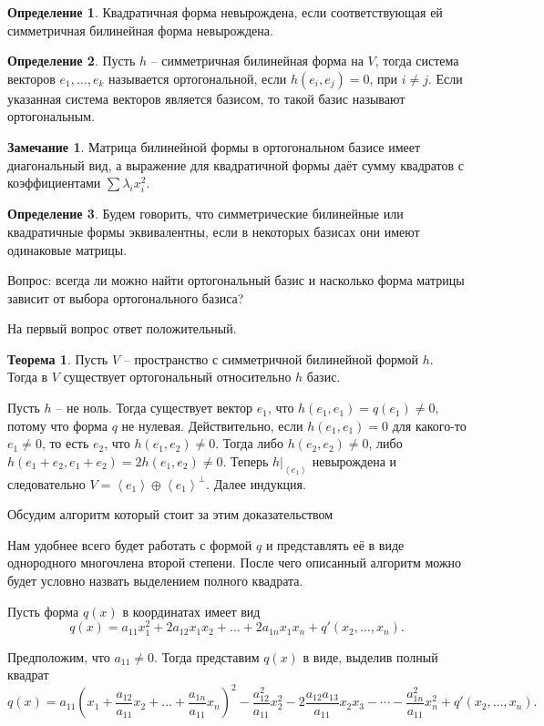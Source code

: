 \documentclass[10pt,a4paper,oneside]{book}
\theoremstyle{definition}
\newtheorem*{rem}{Замечание}
\newtheorem*{defn}{Определение}
\newtheorem{thm}{Теорема}
\def\lan{\left\langle }
\def\ran{\right\rangle}
\def\thrm{\begin{thm}}
\def\ethrm{\end{thm}}
\def\dfn{\begin{defn}}
\def\edfn{\end{defn}}
\def\rm{\begin{rem}}
\def\erm{\end{rem}}
\begin{document}
\dfn Квадратичная форма невырождена, если соответствующая ей симметричная билинейная форма невырождена.
\edfn

\dfn Пусть $h$ -- симметричная билинейная форма на $V$, тогда система векторов $e_1,\dots,e_k$ называется ортогональной, если $h(e_i,e_j)=0$, при $i\neq j$. Если указанная система векторов является базисом, то такой базис называют ортогональным.
\edfn

\rm Матрица билинейной формы в ортогональном базисе имеет диагональный вид, а выражение для квадратичной формы даёт сумму квадратов с коэффициентами $\sum \lambda_i x_i^2$.
\erm

\dfn Будем говорить, что симметрические билинейные или квадратичные формы эквивалентны, если в некоторых базисах они имеют одинаковые матрицы.
\edfn

Вопрос: всегда ли можно найти ортогональный базис и насколько форма матрицы зависит от выбора ортогонального базиса? 

На первый вопрос ответ положительный.

\thrm Пусть $V$ -- пространство с симметричной билинейной формой $h$. Тогда в $V$ существует ортогональный относительно $h$ базис. 
\ethrm
\proof
Пусть $h$ -- не ноль. Тогда существует вектор $e_1$, что $h(e_1,e_1)=q(e_1)\neq 0$, потому что форма $q$ не нулевая. Действительно, если $h(e_1,e_1)=0$ для какого-то $e_1 \neq 0$, то есть $e_2$, что $h(e_1,e_2)\neq 0$. Тогда либо $h(e_2,e_2)\neq 0$, либо $h(e_1+e_2,e_1+e_2)=2h(e_1,e_2)\neq 0$. 
Теперь $h|_{\lan e_1\ran}$ невырождена и следовательно $V=\lan e_1 \ran \oplus \lan e_1 \ran^{\bot}$. Далее индукция.
\endproof







Обсудим алгоритм который стоит за этим доказательством


Нам удобнее всего будет работать с формой $q$ и представлять её в виде однородного многочлена второй степени. После чего описанный алгоритм можно будет условно назвать выделением полного квадрата.

Пусть форма $q(x)$ в координатах имеет вид
$$q(x)= a_{11}x_1^2+ 2a_{12}x_1x_2 + \dots + 2a_{1n}x_1x_n  + q'(x_2, \dots, x_n).$$

 Предположим, что $a_{11}\neq 0$. Тогда представим $q(x)$ в виде, выделив полный квадрат 
$$q(x)= a_{11}\left(x_1+\frac{a_{12}}{a_{11}}x_2 + \dots +\frac{a_{1n}}{a_{11}}x_n\right)^2 - \frac{a_{12}^2}{a_{11}}x_2^2 - 2\frac{a_{12}a_{13}}{a_{11}}x_2x_3 - \cdots - \frac{a_{1n}^2}{a_{11}}x_n^2 + q'(x_2,\dots,x_n).$$
\end{document}
